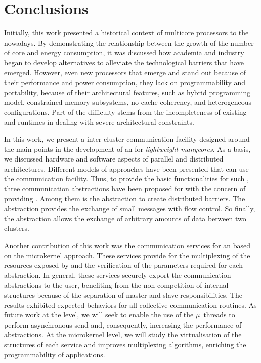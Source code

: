 \chapter{Conclusions}
\label{ch.conclusions}

Initially, this work presented a historical context of multicore
processors to the nowadays.
By demonstrating the relationship between the growth of the number
of core and energy consumption, it was discussed how academia and
industry began to develop alternatives to alleviate the technological
barriers that have emerged.
However, even new processors that emerge and stand out because of
their performance and power consumption,
they lack on programmability and portability, because of their architectural
features, such as hybrid programming model, constrained memory subsystems,
no cache coherency, and heterogeneous configurations.
Part of the difficulty stems from the incompleteness of existing \oss and
runtimes in dealing with severe architectural constraints.

In this work, we present a inter-cluster communication facility
designed around the main points in the development of an \os for \textit{lightweight manycores}.
As a basis, we discussed hardware and software aspects of parallel
and distributed architectures.
Different models of \os approaches have been presented that can
use the communication facility.
Thus, to provide the basic functionalities for such \oss, three
communication abstractions have been proposed for \hal with the
concern of providing \qos.
Among them is the \sync abstraction to create distributed barriers.
The \mailbox abstraction provides the exchange of small messages
with flow control.
So finally, the \portal abstraction allows the exchange of
arbitrary amounts of data between two clusters.

Another contribution of this work was the communication services
for an \os based on the microkernel approach.
These services provide for the multiplexing of the resources
exposed by \hal and the verification of the parameters required
for each abstraction.
In general, these services securely export the communication
abstractions to the user, benefiting from the non-competition
of \os internal structures because of the separation of master
and slave responsibilities.
The results exhibited expected behaviors for all \mpi collective
communication routines. As future work at the \hal level, we will
seek to enable the use of the $\mu$~threads to perform asynchronous
send and, consequently, increasing the performance of abstractions.
At the microkernel level, we will study the virtualisation of the
structures of each service and improves multiplexing algorithms,
enriching the programmability of applications.

